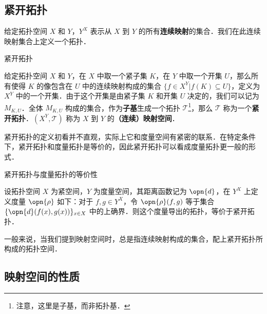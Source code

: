 
\subsection{紧开拓扑}

给定拓扑空间 $X$ 和 $Y$，$Y^X$ 表示从 $X$ 到 $Y$ 的所有\textbf{连续映射}的集合．我们在此连续映射集合上定义一个拓扑．

\begin{definition}{紧开拓扑}

给定拓扑空间 $X$ 和 $Y$，在 $X$ 中取一个紧子集 $K$，在 $Y$ 中取一个开集 $U$，那么所有使得 $K$ 的像包含在 $U$ 中的连续映射构成的集合 $\{f\in X^Y|f(K)\subseteq U\}$，定义为 $X^Y$ 中的一个开集．由于这个开集是由紧子集 $K$ 和开集 $U$ 决定的，我们可以记为 $M_{K, U}$．全体 $M_{K, U}$ 构成的集合，作为\textbf{子基}生成一个拓扑 $\mathcal{T}$\footnote{注意，这里是子基，而非拓扑基．}，那么 $\mathcal{T}$ 称为一个\textbf{紧开拓扑}．$(X^Y, \mathcal{T})$ 称为 $X$ 到 $Y$ 的\textbf{（连续）映射空间}．

\end{definition}

紧开拓扑的定义初看并不直观，实际上它和度量空间有紧密的联系．在特定条件下，紧开拓扑和度量拓扑是等价的，因此紧开拓扑可以看成度量拓扑更一般的形式．

\begin{theorem}{紧开拓扑与度量拓扑的等价性}

设拓扑空间 $X$ 为紧空间，$Y$ 为度量空间，其距离函数记为 $\opn{d}$，在 $Y^X$ 上定义度量 $\opn{\rho}$ 如下：对于 $f, g\in Y^X$，令 $\opn{\rho}(f, g)$ 等于集合 $\{\opn{d}(f(x), g(x))\}_{x\in X}$ 中的上确界．则这个度量导出的拓扑，等价于紧开拓扑．

\end{theorem}

一般来说，当我们提到映射空间时，总是指连续映射构成的集合，配上紧开拓扑所构成的拓扑空间．

\subsection{映射空间的性质}

